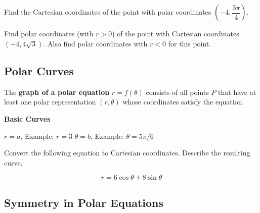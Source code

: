\documentclass[12pt]{article}
\begin{document}
\newpage

\Example Find the Cartesian coordinates of the point with polar coordinates $\left(-4,\dfrac{3\pi}{4}\right)$.

\vfill

\Example Find polar coordinates (with $r>0$) of the point with Cartesian coordinates $\left(-4, 4\sqrt{3}\right)$. Also find polar coordinates with $r<0$ for this point.

\vfill

\subsection*{Polar Curves}

The \textbf{graph of a polar equation} $r=f(\theta)$ consists of all points $P$ that have at least one polar representation $(r,\theta)$ whose coordinates satisfy the equation.

\vspace{4mm}

\textbf{Basic Curves}

\vspace{4mm}

$r=a$, Example: $r=3$ \hspace{50mm} $\theta=b$, Example: $\theta=5\pi/6$

\vfill

\newpage

\Example Convert the following equation to Cartesian coordinates. Describe the resulting curve. 

$$r=6\cos\theta+8\sin\theta$$

\vfill


\vspace{30mm}

\newpage

\subsection*{Symmetry in Polar Equations}
\end{document}
